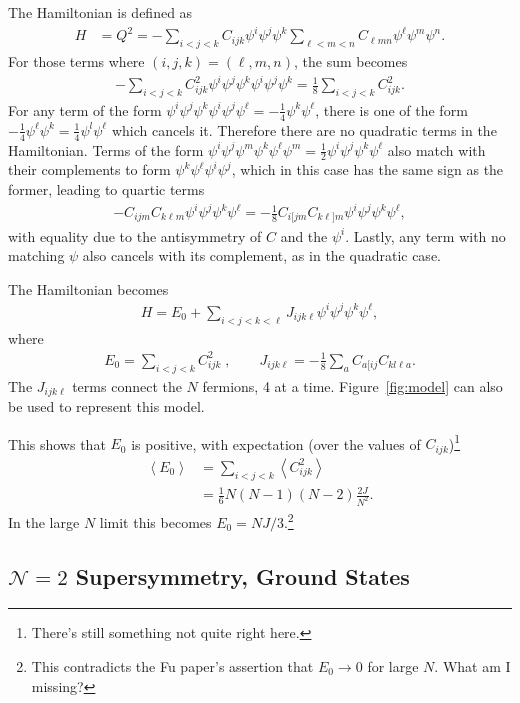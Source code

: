 \documentclass[12pt]{article} %
\renewcommand{\cal}{\mathcal}
\renewcommand{\th}[1]{\frac{1}{#1}}
\newcommand{\ex}[1]{\left\langle #1 \right\rangle}
\renewcommand{\l}{\ell}
\newcommand{\nn}{\nonumber\\}
\begin{document}
The Hamiltonian is defined as
\begin{align}
H &= Q^2 = - \sum_{i<j<k}C_{ijk}\psi^i\psi^j\psi^k\sum_{\l<m<n}C_{\l mn}\psi^\l
	\psi^m\psi^n.
\end{align}
For those terms where $(i,j,k) = (\l,m,n)$, the sum becomes
\begin{align}
-\sum_{i<j<k} C_{ijk}^2 \psi^i\psi^j\psi^k \psi^i\psi^j\psi^k = \th{8} 
	\sum_{i<j<k}C_{ijk}^2.
\end{align}
For any term of the form $\psi^i\psi^j\psi^k\psi^i\psi^j\psi^\l = -\th{4}\psi^k\psi^\l$, there is one of the form $-\th{4}\psi^\l\psi^k=\th{4}\psi^l\psi^\l$ which cancels it. Therefore there are no quadratic terms in the Hamiltonian. Terms of the form $\psi^i\psi^j\psi^m\psi^k\psi^\l\psi^m = \th{2}\psi^i\psi^j\psi^k\psi^\l$ also match with their complements to form $\psi^k\psi^\l\psi^i\psi^j$, which in this case has the same sign as the former, leading to quartic terms
\begin{align}
-C_{ijm}C_{k\l m}\psi^i\psi^j\psi^k\psi^\l = -\th{8}C_{i[jm}C_{k\l]m} \psi^i \psi^j \psi^k\psi^\l,
\end{align}
with equality due to the antisymmetry of $C$ and the $\psi^i$. Lastly, any term with no matching $\psi$ also cancels with its complement, as in the quadratic case.

The Hamiltonian becomes
\begin{align}
H = E_0 + \sum_{i<j<k<\l}J_{ijk\l}\psi^i\psi^j\psi^k\psi^\l, \label{eqn:N1def}
\end{align}
where
\begin{align}
E_0 = \sum_{i<j<k} C_{ijk}^2\;,\qquad J_{ijk\l} = -\th{8}\sum_{a} C_{a[ij}
	C_{kl\l a}.
\end{align}
The $J_{ijk\l}$ terms connect the $N$ fermions, 4 at a time. Figure~\ref{fig:model} can also be used to represent this model.

This shows that $E_0$ is positive, with expectation (over the values of $C_{ijk}$)\footnote{There's still something not quite right here.}
\begin{align}
\ex{E_0} &= \sum_{i<j<k}\ex{C^2_{ijk}}\nn
&= \th{6}N(N-1)(N-2)\frac{2J}{N^2}.
\end{align}
In the large $N$ limit this becomes $E_0 = NJ/3$.\footnote{This contradicts the Fu paper's assertion that $E_0\to 0$ for large $N$. What am I missing?}

\subsection{$\cal{N}=2$ Supersymmetry, Ground States}\emph{} \label{sub:N2}
\end{document}
